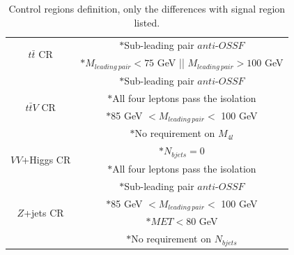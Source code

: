 \begin{table}[h!]
\begin{center}
\caption{Control regions definition, only the differences with signal region listed.}
\label{Tab.CRs summary}
	\begin{tabular}{c|c}
		\toprule
		\toprule
		\multirow{2}{*}{$t\bar{t}$ CR}&$\ast$Sub-leading pair $anti$-$OSSF$\\
		&$\ast{M_{ leading\ pair}<75}$ GeV || $M_{ leading\ pair}>100$ GeV\\
		\midrule
		\multirow{4}{*}{$t\bar{t}V$ CR}&$\ast$Sub-leading pair $anti$-$OSSF$\\
		&$\ast$All four leptons pass the isolation\\
		&$\ast$85 GeV $<M_{ leading\ pair}<$ 100 GeV\\
		&$\ast$No requirement on $M_{ 4l}$\\
		\midrule
		\multirow{2}{*}{$VV$+Higgs CR}&$\ast{N_{ bjets}=0}$\\
		&$\ast$All four leptons pass the isolation\\
		\midrule
		\multirow{4}{*}{$Z$+jets CR}&$\ast$Sub-leading pair $anti$-$OSSF$\\
		&$\ast$85 GeV $<M_{ leading\ pair}<$ 100 GeV\\
		&$\ast{MET<80}$ GeV\\
		&$\ast$No requirement on $N_{ bjets}$\\
		\bottomrule
		\bottomrule
	\end{tabular}
\end{center}
\end{table}

